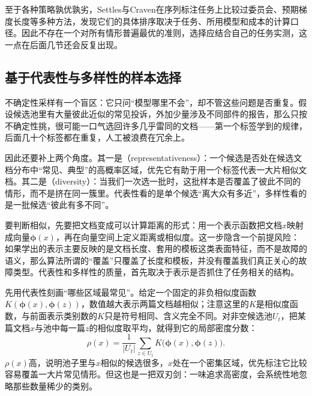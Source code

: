 至于各种策略孰优孰劣，Settles与Craven在序列标注任务上比较过委员会、预期梯度长度等多种方法，发现它们的具体排序取决于任务、所用模型和成本的计算口径。因此不存在一个对所有情形普遍最优的准则，选择应结合自己的任务实测，这一点在后面几节还会反复出现。

\subsection{基于代表性与多样性的样本选择}
\label{sec:knowledge-acquisition-human-representative-diverse-selection}

不确定性采样有一个盲区：它只问“模型哪里不会”，却不管这些问题是否重复。假设候选池里有大量彼此近似的常见投诉，外加少量涉及不同部件的报告，那么只按不确定性挑，很可能一口气选回许多几乎雷同的文档——第一个标签学到的规律，后面几十个标签都在重复，人工被浪费在冗余上。

因此还要补上两个角度。其一是（representativeness）：一个候选是否处在候选文档分布中“常见、典型”的高概率区域，优先它有助于用一个标签代表一大片相似文档。其二是（diversity）：当我们一次选一批时，这批样本是否覆盖了彼此不同的情形，而不是挤在同一簇里。代表性看的是单个候选“离大众有多近”，多样性看的是一批候选“彼此有多不同”。

要判断相似，先要把文档变成可以计算距离的形式：用一个表示函数把文档$x$映射成向量$\bm{\phi}(x)$，再在向量空间上定义距离或相似度。这一步隐含一个前提风险：如果学出的表示主要反映的是文档长度、套用的模板这类表面特征，而不是故障的语义，那么算法所谓的“覆盖”只覆盖了长度和模板，并没有覆盖我们真正关心的故障类型。代表性和多样性的质量，首先取决于表示是否抓住了任务相关的结构。

先用代表性刻画“哪些区域最常见”。给定一个固定的非负相似度函数$K(\bm{\phi}(x),\bm{\phi}(z))$，数值越大表示两篇文档越相似；注意这里的$K$是相似度函数，与前面表示类别数的$K$只是符号相同、含义完全不同。对非空候选池$U_t$，把某篇文档$x$与池中每一篇$z$的相似度取平均，就得到它的局部密度分数：
\begin{equation}
  \rho(x)=\frac{1}{|U_t|}
  \sum_{z\in U_t}K\bigl(\bm{\phi}(x),\bm{\phi}(z)\bigr).
  \label{eq:knowledge-acquisition-human-density}
\end{equation}
$\rho(x)$高，说明池子里与$x$相似的候选很多，$x$处在一个密集区域，优先标注它比较容易覆盖一大片常见情形。但这也是一把双刃剑：一味追求高密度，会系统性地忽略那些数量稀少的类别。

